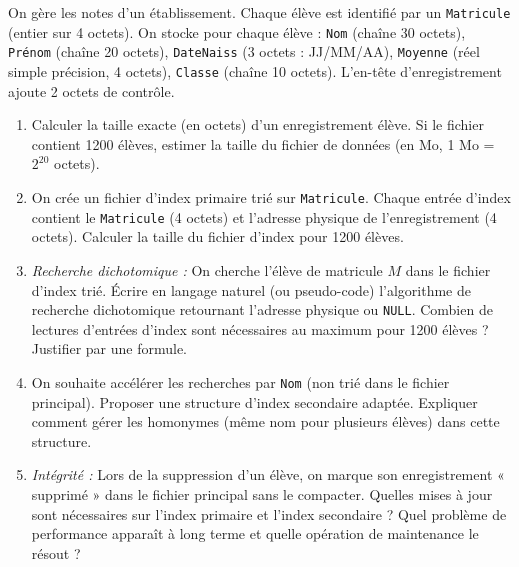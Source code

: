 \documentclass[11pt]{article}
\begin{document}
\begin{exercice}
On gère les notes d'un établissement. Chaque élève est identifié par un \texttt{Matricule} (entier sur 4 octets). On stocke pour chaque élève : \texttt{Nom} (chaîne 30 octets), \texttt{Prénom} (chaîne 20 octets), \texttt{DateNaiss} (3 octets : JJ/MM/AA), \texttt{Moyenne} (réel simple précision, 4 octets), \texttt{Classe} (chaîne 10 octets). L'en-tête d'enregistrement ajoute 2 octets de contrôle.
\begin{enumerate}
    \item Calculer la taille exacte (en octets) d'un enregistrement élève. Si le fichier contient 1200 élèves, estimer la taille du fichier de données (en Mo, 1 Mo = $2^{20}$ octets).
    \item On crée un fichier d'index primaire trié sur \texttt{Matricule}. Chaque entrée d'index contient le \texttt{Matricule} (4 octets) et l'adresse physique de l'enregistrement (4 octets). Calculer la taille du fichier d'index pour 1200 élèves.
    \item \textit{Recherche dichotomique :} On cherche l'élève de matricule $M$ dans le fichier d'index trié. Écrire en langage naturel (ou pseudo-code) l'algorithme de recherche dichotomique retournant l'adresse physique ou \texttt{NULL}. Combien de lectures d'entrées d'index sont nécessaires au maximum pour 1200 élèves ? Justifier par une formule.
    \item On souhaite accélérer les recherches par \texttt{Nom} (non trié dans le fichier principal). Proposer une structure d'index secondaire adaptée. Expliquer comment gérer les homonymes (même nom pour plusieurs élèves) dans cette structure.
    \item \textit{Intégrité :} Lors de la suppression d'un élève, on marque son enregistrement « supprimé » dans le fichier principal sans le compacter. Quelles mises à jour sont nécessaires sur l'index primaire et l'index secondaire ? Quel problème de performance apparaît à long terme et quelle opération de maintenance le résout ?
\end{enumerate}
\end{exercice}
\end{document}
